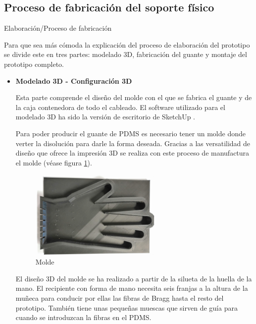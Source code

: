\subsection{Proceso de fabricación del soporte físico}
\label{sec:proceso3}

 \textcolor{rositaoscuro}{Elaboración/Proceso de fabricación}

Para que sea más cómoda la explicación del proceso de elaboración del prototipo se divide este en tres partes: modelado 3D, fabricación del guante y montaje del prototipo completo.

\begin{itemize}
	

	\item \textbf{Modelado 3D - Configuración 3D}
	
	Esta parte comprende el diseño del molde con el que se fabrica el guante y de la caja contenedora de todo el cableado. El software utilizado para el modelado 3D ha sido la versión de escritorio de SketchUp \cite{SketchUp}.
	
	
	Para poder producir el guante de PDMS es necesario tener un molde donde verter la disolución para darle la forma deseada. Gracias a las versatilidad de diseño que ofrece la impresión 3D se realiza con este proceso de manufactura el molde (véase figura \ref{fig:molde}). 

	\begin{figure}[H]
		\centering
		\includegraphics[width=0.6\textwidth]{./img/molde}
		\caption{Molde} \label{fig:molde}
	\end{figure}
 
 	El diseño 3D del molde se ha realizado a partir de la silueta de la huella de la mano. El recipiente con forma de mano necesita seis franjas a la altura de la muñeca para conducir por ellas las fibras de Bragg hasta el resto del prototipo. También tiene unas pequeñas muescas que sirven de guía para cuando se introduzcan la fibras en el PDMS.
 	 	

\end{itemize}

